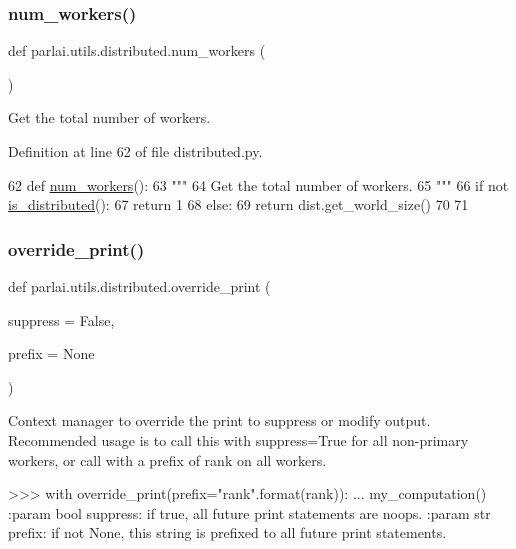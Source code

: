 \subsubsection{\texorpdfstring{num\+\_\+workers()}{num\_workers()}}
{\footnotesize\ttfamily def parlai.\+utils.\+distributed.\+num\+\_\+workers (\begin{DoxyParamCaption}{ }\end{DoxyParamCaption})}

\begin{DoxyVerb}Get the total number of workers.
\end{DoxyVerb}
 

Definition at line 62 of file distributed.\+py.


\begin{DoxyCode}
62 \textcolor{keyword}{def }\hyperlink{namespaceparlai_1_1utils_1_1distributed_a99b61b4756577c6542039c238d670dba}{num\_workers}():
63     \textcolor{stringliteral}{"""}
64 \textcolor{stringliteral}{    Get the total number of workers.}
65 \textcolor{stringliteral}{    """}
66     \textcolor{keywordflow}{if} \textcolor{keywordflow}{not} \hyperlink{namespaceparlai_1_1utils_1_1distributed_a023acb5e3b66e1f27e21247c35661279}{is\_distributed}():
67         \textcolor{keywordflow}{return} 1
68     \textcolor{keywordflow}{else}:
69         \textcolor{keywordflow}{return} dist.get\_world\_size()
70 
71 
\end{DoxyCode}
\mbox{\label{namespaceparlai_1_1utils_1_1distributed_a601345e55fc3fc3845c43efa1a04db56}} 
\subsubsection{\texorpdfstring{override\+\_\+print()}{override\_print()}}
{\footnotesize\ttfamily def parlai.\+utils.\+distributed.\+override\+\_\+print (\begin{DoxyParamCaption}\item[{}]{suppress = {\ttfamily False},  }\item[{}]{prefix = {\ttfamily None} }\end{DoxyParamCaption})}

\begin{DoxyVerb}Context manager to override the print to suppress or modify output. Recommended
usage is to call this with suppress=True for all non-primary workers, or call with a
prefix of rank on all workers.

>>> with override_print(prefix="rank{}".format(rank)):
...     my_computation()
:param bool suppress:
    if true, all future print statements are noops.
:param str prefix:
    if not None, this string is prefixed to all future print statements.
\end{DoxyVerb}
 

